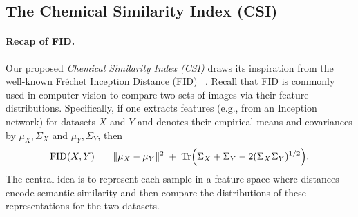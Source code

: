

\subsection{The Chemical Similarity Index (CSI)}


\paragraph{Recap of FID.} 
Our proposed \emph{Chemical Similarity Index (CSI)} draws its inspiration from the well-known Fréchet Inception Distance (\textsc{FID}) ~\cite{heusel2017gans}. Recall that FID is commonly used in computer vision to compare two sets of images via their feature distributions. Specifically, if one extracts features (e.g., from an Inception network) for datasets \(X\) and \(Y\) and denotes their empirical means and covariances by \(\mu_X, \Sigma_X\) and \(\mu_Y, \Sigma_Y\), then
\begin{equation}
\mathrm{FID}(X, Y)
\;=\;
\|\mu_X - \mu_Y\|^2
\;+\;
\mathrm{Tr}\Bigl(\Sigma_X + \Sigma_Y - 2(\Sigma_X \Sigma_Y)^{1/2}\Bigr).
\end{equation}
The central idea is to represent each sample in a feature space where distances encode semantic similarity and then compare the distributions of these representations for the two datasets.


